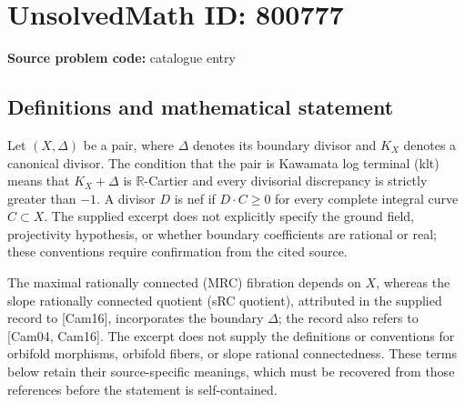 \documentclass[11pt]{article}
\newcommand{\R}{\mathbb{R}}
\begin{document}
\section*{UnsolvedMath ID: 800777}
\textbf{Source problem code:} catalogue entry
\subsection{Definitions and mathematical statement}
Let \((X,\Delta)\) be a pair, where \(\Delta\) denotes its boundary divisor and \(K_X\) denotes a canonical divisor. The condition that the pair is Kawamata log terminal (klt) means that \(K_X+\Delta\) is \(\R\)-Cartier and every divisorial discrepancy is strictly greater than \(-1\). A divisor \(D\) is nef if \(D\cdot C\geq 0\) for every complete integral curve \(C\subset X\). The supplied excerpt does not explicitly specify the ground field, projectivity hypothesis, or whether boundary coefficients are rational or real; these conventions require confirmation from the cited source.

The maximal rationally connected (MRC) fibration depends on \(X\), whereas the slope rationally connected quotient (sRC quotient), attributed in the supplied record to [Cam16], incorporates the boundary \(\Delta\); the record also refers to [Cam04, Cam16]. The excerpt does not supply the definitions or conventions for orbifold morphisms, orbifold fibers, or slope rational connectedness. These terms below retain their source-specific meanings, which must be recovered from those references before the statement is self-contained.
\end{document}
